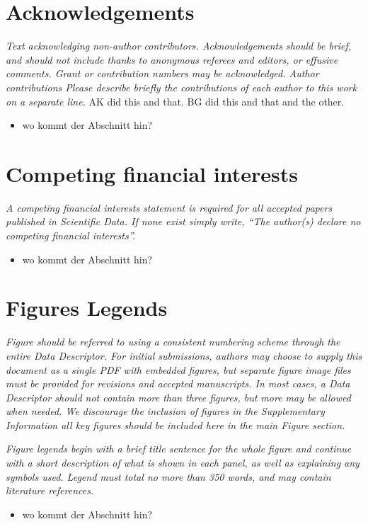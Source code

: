 \documentclass[english]{article}
\begin{document}
\section*{Acknowledgements}

\emph{Text acknowledging non-author contributors. Acknowledgements should
be brief, and should not include thanks to anonymous referees and
editors, or effusive comments. Grant or contribution numbers may be
acknowledged. Author contributions Please describe briefly the contributions
of each author to this work on a separate line.} 
AK did this and that. 
BG did this and that and the other.
\begin{itemize}
\item wo kommt der Abschnitt hin?
\end{itemize}

\section*{Competing financial interests}

\emph{A competing financial interests statement is required for all accepted
papers published in \emph{Scientific Data}. If none exist simply write,
``The author(s) declare no competing financial interests''.}
\begin{itemize}
\item wo kommt der Abschnitt hin?
\end{itemize}

\section*{Figures Legends}

\emph{Figure should be referred to using a consistent numbering scheme through
the entire Data Descriptor. For initial submissions, authors may choose
to supply this document as a single PDF with embedded figures, but
separate figure image files must be provided for revisions and accepted
manuscripts. In most cases, a Data Descriptor should not contain more
than three figures, but more may be allowed when needed. We discourage
the inclusion of figures in the Supplementary Information \textendash{}
all key figures should be included here in the main Figure section.} 

\emph{Figure legends begin with a brief title sentence for the whole figure
and continue with a short description of what is shown in each panel,
as well as explaining any symbols used. Legend must total no more
than 350 words, and may contain literature references.} 
\begin{itemize}
\item wo kommt der Abschnitt hin?
\end{itemize}
\end{document}
